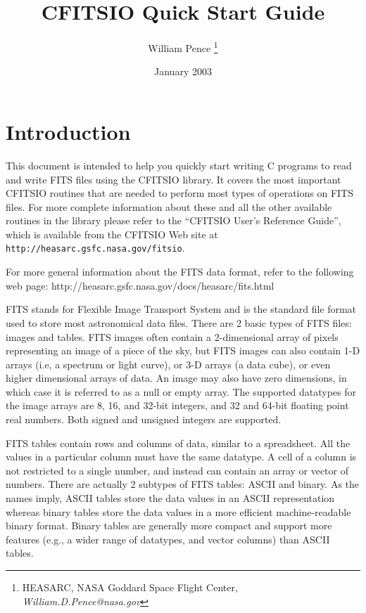 \documentclass[11pt]{article}
\title{CFITSIO Quick Start Guide}
\author{William Pence \thanks{HEASARC, NASA Goddard Space Flight Center,
{\it William.D.Pence@nasa.gov}}}
\date{January 2003}
\begin{document}
\maketitle
\tableofcontents

\section{Introduction}

This document is intended to help you quickly start writing C programs
to read and write FITS files using the CFITSIO library.  It covers the
most important CFITSIO routines that are needed to perform most types
of operations on FITS files. For more complete information about these
and all the other available routines in the library please refer to
the  ``CFITSIO User's Reference Guide'', which is available from the
CFITSIO Web site at {\tt http://heasarc.gsfc.nasa.gov/fitsio}.

For more general information about the FITS data format, refer to the
following web page:
http://heasarc.gsfc.nasa.gov/docs/heasarc/fits.html

FITS stands for Flexible Image Transport System and is the standard
file format used to store most astronomical data files.  There are 2
basic types of FITS files: images and tables.  FITS images often
contain a 2-dimensional array of pixels representing an image of a
piece of the sky, but  FITS images can also contain 1-D arrays (i.e,
a spectrum or light curve), or  3-D arrays (a data cube), or
even higher dimensional arrays of data.   An image may also have zero
dimensions, in which case it is referred to as a null or empty array.
The supported datatypes for the image arrays are 8, 16, and 32-bit
integers, and 32 and 64-bit floating point real numbers.  Both signed
and unsigned integers are supported.

FITS tables contain rows and columns of data, similar to a
spreadsheet.  All the values in a particular column must have the same
datatype.  A cell of a column is not restricted to a single number, and
instead can contain an array or vector of numbers.  There are actually
2 subtypes of FITS tables: ASCII and binary. As the names imply,  ASCII
tables store the data values in an ASCII representation whereas binary
tables store the data values in a more efficient machine-readable
binary format.  Binary tables are generally more compact and support
more features (e.g., a wider range of datatypes, and vector columns)
than ASCII tables.
\end{document}
